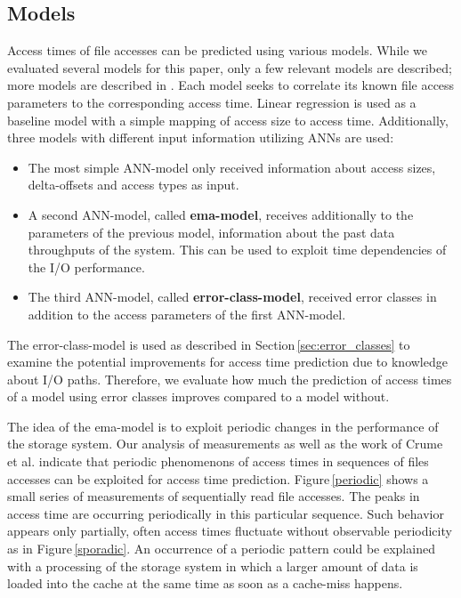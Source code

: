 \documentclass{superfri}
\begin{document}
	\subsection{Models}
	Access times of file accesses can be predicted using various models.
	While we evaluated several models for this paper, only a few relevant models are described; more models are described in \cite{VVEIHUDVVN15}. 
	Each model seeks to correlate its known file access parameters to the corresponding access time. 
	Linear regression is used as a baseline model with a simple mapping of access size to access time.
	Additionally, three models with different input information utilizing ANNs are used:
	\begin{itemize}
		\item The most simple ANN-model only received information about access sizes, delta-offsets and access types as input.
		\item A second ANN-model, called \textbf{ema-model}, receives additionally to the parameters of the previous model,  information about the past data throughputs of the system. This can be used to exploit time dependencies of the I/O performance.
		\item The third ANN-model, called \textbf{error-class-model}, received error classes in addition to the access parameters of the first ANN-model.
	\end{itemize}\medskip
	
	The error-class-model is used as described in Section\,\ref{sec:error_classes} to examine the potential improvements for access time prediction due to knowledge about I/O paths.
	Therefore, we evaluate how much the prediction of access times of a model using error classes improves compared to a model without.
	
	The idea of the ema-model is to exploit periodic changes in the performance of the storage system.
	Our analysis of measurements as well as the work of Crume et al. \cite{Crume:2013:FML:2538542.2538561} indicate that periodic phenomenons of access times in sequences of files accesses can be exploited for access time prediction.
	Figure\,\ref{periodic} shows a small series of measurements of sequentially read file accesses.
	The peaks in access time are occurring periodically in this particular sequence. Such behavior appears only partially, often access times fluctuate without observable periodicity as in Figure\,\ref{sporadic}.
	An occurrence of a periodic pattern could be explained with a processing of the storage system in which a larger amount of data is loaded into the cache at the same time as soon as a cache-miss happens.
	
\end{document}
